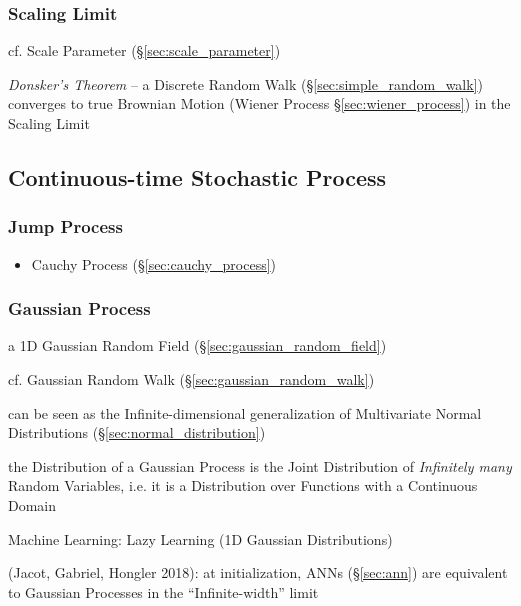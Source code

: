 \subsubsection{Scaling Limit}\label{sec:scaling_limit}

cf. Scale Parameter (\S\ref{sec:scale_parameter})

\emph{Donsker's Theorem} -- a Discrete Random Walk
(\S\ref{sec:simple_random_walk}) converges to true Brownian Motion (Wiener
Process \S\ref{sec:wiener_process}) in the Scaling Limit



\subsection{Continuous-time Stochastic Process}\label{sec:continuous_stochastic}

\subsubsection{Jump Process}\label{sec:jump_process}

\begin{itemize}
  \item Cauchy Process (\S\ref{sec:cauchy_process})
\end{itemize}



\subsubsection{Gaussian Process}\label{sec:gaussian_process}

a 1D Gaussian Random Field (\S\ref{sec:gaussian_random_field})

cf. Gaussian Random Walk (\S\ref{sec:gaussian_random_walk})

can be seen as the Infinite-dimensional generalization of Multivariate Normal
Distributions (\S\ref{sec:normal_distribution})

the Distribution of a Gaussian Process is the Joint Distribution of
\emph{Infinitely many} Random Variables, i.e. it is a Distribution over
Functions with a Continuous Domain

Machine Learning: Lazy Learning (1D Gaussian Distributions)

(Jacot, Gabriel, Hongler 2018): at initialization, ANNs (\S\ref{sec:ann}) are
equivalent to Gaussian Processes in the ``Infinite-width'' limit

